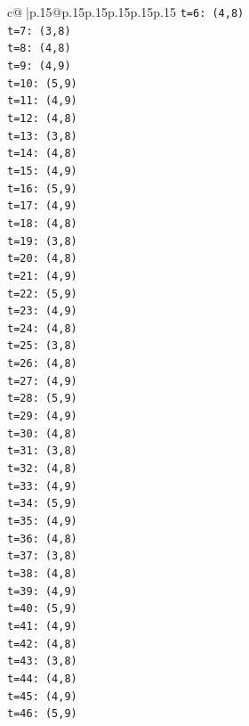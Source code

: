 \documentclass{article}
\begin{document}
{\begin{supertabular}{c@{$\;$}|p{.15\linewidth}@{}p{.15\linewidth}p{.15\linewidth}p{.15\linewidth}p{.15\linewidth}p{.15\linewidth}}
{{{\texttt{t=6: (4,8)} \\
\texttt{t=7: (3,8)} \\
\texttt{t=8: (4,8)} \\
\texttt{t=9: (4,9)} \\
\texttt{t=10: (5,9)} \\
\texttt{t=11: (4,9)} \\
\texttt{t=12: (4,8)} \\
\texttt{t=13: (3,8)} \\
\texttt{t=14: (4,8)} \\
\texttt{t=15: (4,9)} \\
\texttt{t=16: (5,9)} \\
\texttt{t=17: (4,9)} \\
\texttt{t=18: (4,8)} \\
\texttt{t=19: (3,8)} \\
\texttt{t=20: (4,8)} \\
\texttt{t=21: (4,9)} \\
\texttt{t=22: (5,9)} \\
\texttt{t=23: (4,9)} \\
\texttt{t=24: (4,8)} \\
\texttt{t=25: (3,8)} \\
\texttt{t=26: (4,8)} \\
\texttt{t=27: (4,9)} \\
\texttt{t=28: (5,9)} \\
\texttt{t=29: (4,9)} \\
\texttt{t=30: (4,8)} \\
\texttt{t=31: (3,8)} \\
\texttt{t=32: (4,8)} \\
\texttt{t=33: (4,9)} \\
\texttt{t=34: (5,9)} \\
\texttt{t=35: (4,9)} \\
\texttt{t=36: (4,8)} \\
\texttt{t=37: (3,8)} \\
\texttt{t=38: (4,8)} \\
\texttt{t=39: (4,9)} \\
\texttt{t=40: (5,9)} \\
\texttt{t=41: (4,9)} \\
\texttt{t=42: (4,8)} \\
\texttt{t=43: (3,8)} \\
\texttt{t=44: (4,8)} \\
\texttt{t=45: (4,9)} \\
\texttt{t=46: (5,9)} \\
}}}
\end{supertabular}}
\end{document}

